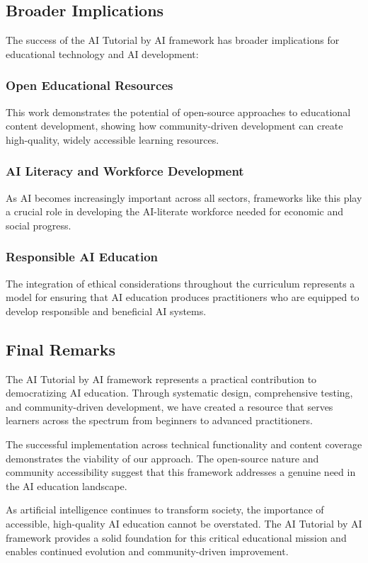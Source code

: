 \subsection{Broader Implications}

The success of the AI Tutorial by AI framework has broader implications for educational technology and AI development:

\subsubsection{Open Educational Resources}

This work demonstrates the potential of open-source approaches to educational content development, showing how community-driven development can create high-quality, widely accessible learning resources.

\subsubsection{AI Literacy and Workforce Development}

As AI becomes increasingly important across all sectors, frameworks like this play a crucial role in developing the AI-literate workforce needed for economic and social progress.

\subsubsection{Responsible AI Education}

The integration of ethical considerations throughout the curriculum represents a model for ensuring that AI education produces practitioners who are equipped to develop responsible and beneficial AI systems.

\subsection{Final Remarks}

The AI Tutorial by AI framework represents a practical contribution to democratizing AI education. Through systematic design, comprehensive testing, and community-driven development, we have created a resource that serves learners across the spectrum from beginners to advanced practitioners.

The successful implementation across technical functionality and content coverage demonstrates the viability of our approach. The open-source nature and community accessibility suggest that this framework addresses a genuine need in the AI education landscape.

As artificial intelligence continues to transform society, the importance of accessible, high-quality AI education cannot be overstated. The AI Tutorial by AI framework provides a solid foundation for this critical educational mission and enables continued evolution and community-driven improvement.